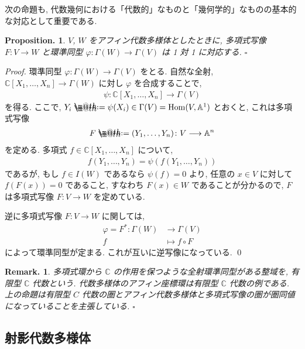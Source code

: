 \documentclass[openany, a4paper, oneside]{jsbook}
\makeatletter
\newcommand*{\defeq}{\mathrel{\rlap{%
\raisebox{0.3ex}{$\m@th\cdot$}}%
\raisebox{-0.3ex}{$\m@th\cdot$}}%
=}
\theoremstyle{break}
\theoremstyle{breakdefn}
\newtheorem{prop}[thm]{Proposition.}
\newtheorem{rem}[thm]{Remark.}
\newcommand{\fin}{\hfill $\square$ \par}
\newcommand{\homo}{\mathrm{Hom}}
\newcommand{\map}{\longrightarrow}
\makeatother
\begin{document}
次の命題も, 代数幾何における「代数的」なものと「幾何学的」なものの基本的な対応として重要である.
\begin{prop}
$V$, $W$ をアフィン代数多様体としたときに,
多項式写像 $F \colon V \to W$ と環準同型 $\varphi \colon \Gamma (W) \to \Gamma (V)$ は 1 対 1 に対応する. \fin
\end{prop}
\begin{proof}
環準同型 $\varphi \colon \Gamma (W) \to \Gamma (V)$ をとる.
自然な全射, $\mathbb{C}[X_1,\dots,X_n] \to \Gamma (W)$ に対し $\varphi$ を合成することで,
\begin{align}
 \psi \colon \mathbb{C}[X_1,\dots,X_n] \map \Gamma (V)
\end{align}
を得る.
ここで, $Y_i \defeq  \psi (X_i) \in \Gamma (V) = \homo (V, \mathbb{A}^1)$ とおくと, これは多項式写像
\begin{align}
 F
 \defeq
 (Y_1,\dots,Y_n) \colon V \map \mathbb{A}^n
\end{align}
を定める.
多項式 $f \in \mathbb{C}[X_1,\dots,X_n]$ について,
\begin{align}
 f(Y_1,\dots,Y_n)
 =
 \psi(f(Y_1,\dots,Y_n))
\end{align}
であるが, もし $f \in I (W)$ であるなら $\psi (f)=0$ より,
任意の $x \in V$ に対して $f (F (x))=0$ であること,
すなわち $F (x) \in W$ であることが分かるので, $F$ は多項式写像 $F \colon V \to W$ を定めている.

逆に多項式写像 $F \colon V \to W$ に関しては,
\begin{align}
 \varphi
 =
 F^* \colon \Gamma (W)
 &\map
 \Gamma (V) \\
 f
 &\longmapsto
 f \circ F
\end{align}
によって環準同型が定まる.
これが互いに逆写像になっている. \qed
\end{proof}
\begin{rem}
多項式環から $\mathbb{C}$ の作用を保つような全射環準同型がある整域を,
有限型 $\mathbb{C}$ 代数という.
代数多様体のアフィン座標環は有限型 $\mathbb{C}$ 代数の例である.
上の命題は有限型 $C$ 代数の圏とアフィン代数多様体と多項式写像の圏が圏同値になっていることを主張している. \fin
\end{rem}
\subsection{射影代数多様体}
\end{document}
